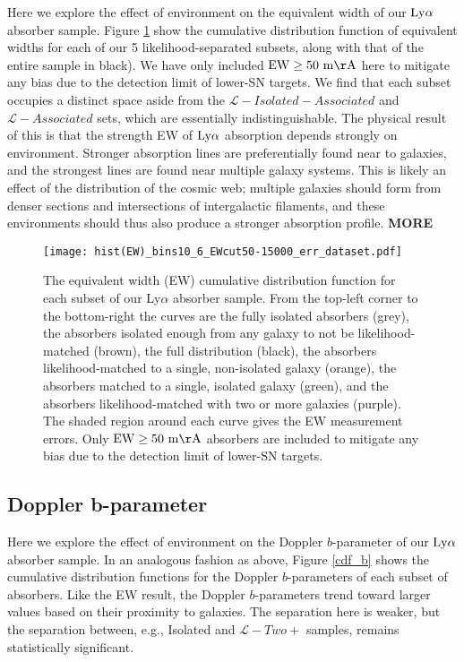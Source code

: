 \documentclass[twocolumn,tighten]{aastex62}
\begin{document}
Here we explore the effect of environment on the equivalent width of our $\rm Ly\alpha$ absorber sample. Figure \ref{cdf_ew} show the cumulative distribution function of equivalent widths for each of our 5 likelihood-separated subsets, along with that of the entire sample in black). We have only included $\rm EW \ge 50~m\AA$ here to mitigate any bias due to the detection limit of lower-SN targets. We find that each subset occupies a distinct space aside from the $\mathcal{L}-Isolated-Associated$ and $\mathcal{L}-Associated$ sets, which are essentially indistinguishable. The physical result of this is that the strength EW of $\rm Ly\alpha$ absorption depends strongly on environment. Stronger absorption lines are preferentially found near to galaxies, and the strongest lines are found near multiple galaxy systems. This is likely an effect of the distribution of the cosmic web; multiple galaxies should form from denser sections and intersections of intergalactic filaments, and these environments should thus also produce a stronger absorption profile. \textbf{MORE}

\begin{figure}[ht!]
        \centering
        \vspace{0pt}
        \texttt{[image: hist(EW)\_bins10\_6\_EWcut50-15000\_err\_dataset.pdf]}
        \caption{\small{The equivalent width (EW) cumulative distribution function for each subset of our Ly$\alpha$ absorber sample. From the top-left corner to the bottom-right the curves are the fully isolated absorbers (grey), the absorbers isolated enough from any galaxy to not be likelihood-matched (brown), the full distribution (black), the absorbers likelihood-matched to a single, non-isolated galaxy (orange), the absorbers matched to a single, isolated galaxy (green), and the absorbers likelihood-matched with two or more galaxies (purple). The shaded region around each curve gives the EW measurement errors. Only $\rm EW \ge 50~m\AA$ absorbers are included to mitigate any bias due to the detection limit of lower-SN targets.}}
        \vspace{5pt}
        \label{cdf_ew}
\end{figure}


\subsection{Doppler b-parameter}

Here we explore the effect of environment on the Doppler $b$-parameter of our $\rm Ly\alpha$ absorber sample. In an analogous fashion as above, Figure \ref{cdf_b} shows the cumulative distribution functions for the Doppler $b$-parameters of each subset of absorbers. Like the EW result, the Doppler $b$-parameters trend toward larger values based on their proximity to galaxies. The separation here is weaker, but the separation between, e.g., Isolated and $\mathcal{L}-Two+$ samples, remains statistically significant.
\end{document}
